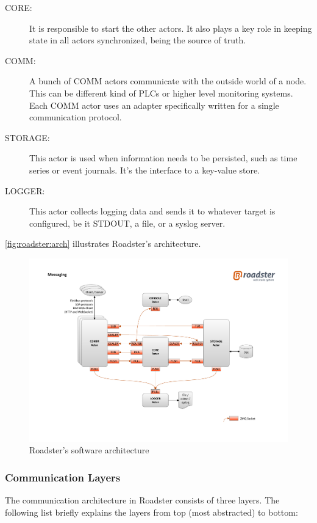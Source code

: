 \begin{description}
	\item [CORE:]
		It is responsible to start the other actors. It also plays a
		key role in keeping state in all actors synchronized, being the
		source of truth.

	\item [COMM:]
		A bunch of COMM actors communicate with the outside world of a
		node. This can be different kind of \glspl{PLC} or higher level
		monitoring systems. Each COMM actor uses an adapter
		specifically written for a single communication protocol.

	\item [STORAGE:]
		This actor is used when information needs to be persisted, such
		as time series or event journals. It's the interface to a
		key-value store.

	\item [LOGGER:]
		This actor collects logging data and sends it to whatever
		target is configured, be it STDOUT, a file, or a syslog server.
\end{description}

\autoref{fig:roadster:arch} illustrates Roadster's architecture.

\begin{figure}[!ht]
	\includegraphics[trim=4cm 2cm 3.5cm 2.8cm, clip=true, width=\textwidth]{img/roadster_arch.pdf}
	\caption{Roadster's software architecture}
	\label{fig:roadster:arch}
\end{figure}

\subsubsection{Communication Layers}
The communication architecture in Roadster consists of three layers. The following list briefly explains the layers from top (most abstracted) to bottom:

